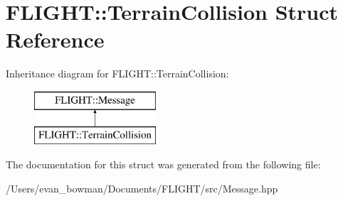 \hypertarget{struct_f_l_i_g_h_t_1_1_terrain_collision}{}\section{F\+L\+I\+G\+HT\+:\+:Terrain\+Collision Struct Reference}
\label{struct_f_l_i_g_h_t_1_1_terrain_collision}
Inheritance diagram for F\+L\+I\+G\+HT\+:\+:Terrain\+Collision\+:\begin{figure}[H]
\begin{center}
\leavevmode
\includegraphics[height=2.000000cm]{struct_f_l_i_g_h_t_1_1_terrain_collision}
\end{center}
\end{figure}


The documentation for this struct was generated from the following file\+:\begin{DoxyCompactItemize}
\item 
/\+Users/evan\+\_\+bowman/\+Documents/\+F\+L\+I\+G\+H\+T/src/Message.\+hpp\end{DoxyCompactItemize}
